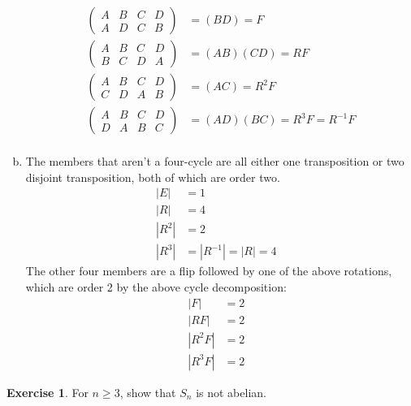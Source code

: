 \documentclass[11pt,oneside]{article}
\numberwithin{equation}{section}
\theoremstyle{definition}
\newtheorem{exercise}{Exercise}
\begin{document}
\begin{solution}
\begin{enumerate}[(a)]
    \begin{align*}
    \begin{pmatrix}
      A & B & C & D \\ 
      A & D & C & B
    \end{pmatrix} & = (B D) = F \\ 
    \begin{pmatrix}
      A & B & C & D \\ 
      B & C & D & A 
    \end{pmatrix} & = (A B) (C D) = RF \\ 
    \begin{pmatrix}
      A & B & C & D \\ 
      C & D & A & B
    \end{pmatrix} & = (A C) = R^2 F  \\ 
    \begin{pmatrix}
      A & B & C & D \\ 
      D & A & B & C
    \end{pmatrix} & = (A D)(B C)  = R ^ 3 F  = R ^ {-1} F \\
    \end{align*}
  \item
    The members that aren't a four-cycle are all either one 
    transposition or two disjoint transposition, both of which
    are order two.
    \begin{align*}
      |E| & = 1 & \\
      |R| & = 4 & \\
      |R^2| &= 2 & \\
      |R^3| & = | R ^{-1} | = | R | = 4 & 
    \end{align*}
    The other four members are a flip followed by one of the above rotations, which are
    order 2 by the above cycle decomposition:
    \begin{align*}
      |F| & = 2 & \\
      |R F| & = 2 & \\
      |R^2 F| &= 2 & \\
      |R^3 F| & = 2 & 
    \end{align*}
  \end{enumerate}
\end{solution}

\begin{exercise}
  For $n \geq 3$, show that $S _n $ is not abelian.
\end{exercise}
\end{document}
